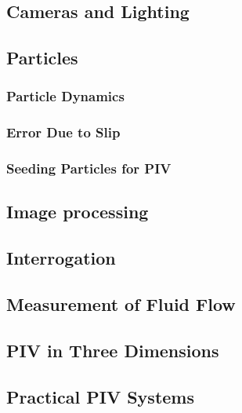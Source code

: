 \subsection{Cameras and Lighting}

\subsection{Particles}

\subsubsection{Particle Dynamics} 

\subsubsection{Error Due to Slip}

\subsubsection{Seeding Particles for PIV}

\subsection{Image processing}

\subsection{Interrogation}

\subsection{Measurement of Fluid Flow}

\subsection{PIV in Three Dimensions}

\subsection{Practical PIV Systems}



